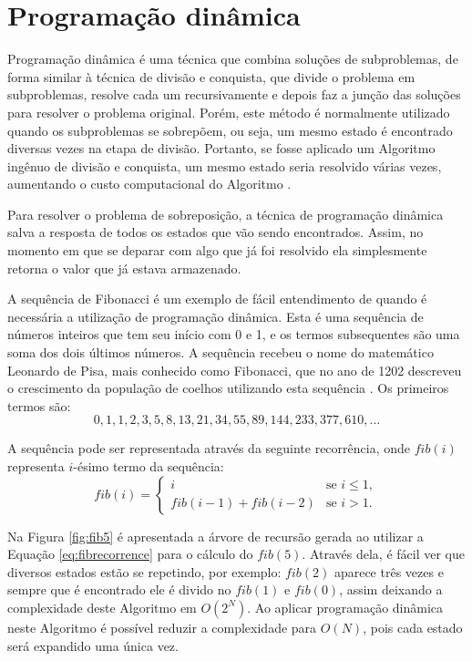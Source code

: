 \section{Programação dinâmica}
\label{sec:pd}

Programação dinâmica é uma técnica que combina soluções de subproblemas, de forma similar à técnica de divisão e conquista, que divide o problema em subproblemas, resolve cada um recursivamente e depois faz a junção das soluções para resolver o problema original. Porém, este método é normalmente utilizado quando os subproblemas se sobrepõem, ou seja, um mesmo estado é encontrado diversas vezes na etapa de divisão. Portanto, se fosse aplicado um Algoritmo ingênuo de divisão e conquista, um mesmo estado seria resolvido várias vezes, aumentando o custo computacional do Algoritmo \cite{Cormen09a}. 

Para resolver o problema de sobreposição, a técnica de programação dinâmica salva a resposta de todos os estados que vão sendo encontrados. Assim, no momento em que se deparar com algo que já foi resolvido ela simplesmente retorna o valor que já estava armazenado. 

A sequência de Fibonacci é um exemplo de fácil entendimento de quando é necessária a utilização de programação dinâmica. Esta é uma sequência de números inteiros que tem seu início com 0 e 1, e os termos subsequentes são uma soma dos dois últimos números. A sequência recebeu o nome do matemático Leonardo de Pisa, mais conhecido como Fibonacci, que no ano de 1202 descreveu o crescimento da população de coelhos utilizando esta sequência \cite{LiveScience2013}. Os primeiros termos são:
\begin{equation}
0, 1, 1, 2, 3, 5, 8, 13, 21, 34, 55, 89, 144, 233, 377, 610, ...
\label{eq:fib}
\end{equation}

A sequência pode ser representada através da seguinte recorrência, onde $fib(i)$ representa $i$-ésimo termo da sequência:
\begin{equation}
fib(i)=
\begin{cases}
i &\text{se } i \leq{1},\\
fib(i - 1) + fib(i - 2) &\text{se } i > {1}.
\end{cases}
\label{eq:fibrecorrence}
\end{equation}

Na Figura \ref{fig:fib5} é apresentada a árvore de recursão gerada ao utilizar a Equação \ref{eq:fibrecorrence} para o cálculo do $fib(5)$. Através dela, é fácil ver que diversos estados estão se repetindo, por exemplo: $fib(2)$ aparece três vezes e sempre que é encontrado ele é divido no $fib(1)$ e $fib(0)$, assim deixando a  complexidade deste Algoritmo em $O(2^{N})$. Ao aplicar programação dinâmica neste Algoritmo é possível reduzir a complexidade para $O(N)$, pois cada estado será expandido uma única vez.

